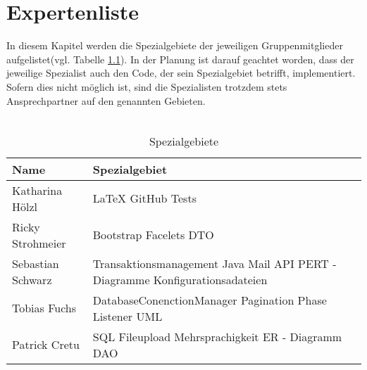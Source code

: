 \chapter{Expertenliste}

In diesem Kapitel werden die Spezialgebiete der jeweiligen Gruppenmitglieder aufgelistet(vgl. Tabelle \ref{fig:spezialgebiete}).
In der Planung ist darauf geachtet worden, dass der jeweilige Spezialist auch den Code, der sein
Spezialgebiet betrifft, implementiert.
Sofern dies nicht möglich ist, sind die Spezialisten trotzdem stets Ansprechpartner auf
den genannten Gebieten.\ \\
\ \\
\begin{table}[h]
	\begin{center}
	\begin{tabular}{|p{6cm}|p{6cm}|}
		\hline \textbf{Name} & \textbf{Spezialgebiet}  \\ 
		\hline Katharina Hölzl & LaTeX \newline
		                         GitHub \newline
		                         Tests    \\ 
		\hline Ricky Strohmeier & Bootstrap \newline
		                          Facelets \newline
		                          DTO  \\ 
		\hline Sebastian Schwarz & Transaktionsmanagement \newline
		                           Java Mail API \newline
		                           PERT - Diagramme \newline
		                           Konfigurationsadateien \\ 
		\hline Tobias Fuchs &    DatabaseConenctionManager \newline
		                         Pagination \newline
		                         Phase Listener \newline
		                         UML \\ 
		\hline Patrick Cretu &  SQL \newline
		                        Fileupload \newline
		                        Mehrsprachigkeit \newline
		                        ER - Diagramm \newline
		                        DAO\\ 
		\hline 
	\end{tabular} 
\caption{Spezialgebiete}
\label{fig:spezialgebiete}
\end{center}
\end{table}
